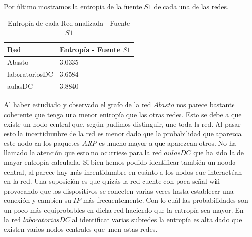 Por último mostramos la entropia de la fuente $S1$ de cada una de las redes.\\

\begin{table}[htb]
\begin{center}
\begin{tabular}{|l|l|}
\hline
Red & Entropía - Fuente $S1$  \\
\hline \hline
Abasto & 3.0335 \\ \hline
laboratoriosDC & 3.6584 \\ \hline
aulasDC & 3.8840  \\ \hline
\end{tabular}
\caption{Entropía de cada Red analizada - Fuente $S1$}
\label{tabla informacion}
\end{center}
\end{table}

Al haber estudiado y observado el grafo de la red $Abasto$ nos parece bastante coherente que tenga una menor entropía que las otras redes. Esto se 
debe a que existe un nodo central que, según pudimos distinguir, une toda la red. Al pasar esto la incertidumbre de la red es menor dado que 
la probabilidad que aparezca este nodo en los paquetes $ARP$ es mucho mayor a que aparezcan otros. No ha llamado la atención que esto no ocurriese 
para la red $aulasDC$ que ha sido la de mayor entropía calculada. Si bien hemos podido identificar también un noodo central, al parece hay más 
incentidumbre en cuánto a los nodos que interactúan en la red. Una suposición es que quizás la red cuente con poca señal wifi provocando que 
los dispositivos se conecten varias veces hasta establecer una conexión y cambien su $IP$ más frecuentemente. Con lo cuál las probabilidades son un 
poco más equiprobables en dicha red haciendo que la entropía sea mayor.
En la red $laboratoriosDC$ al identificar varias subredes la entropía es alta dado que existen varios nodos centrales que unen estas redes. 

